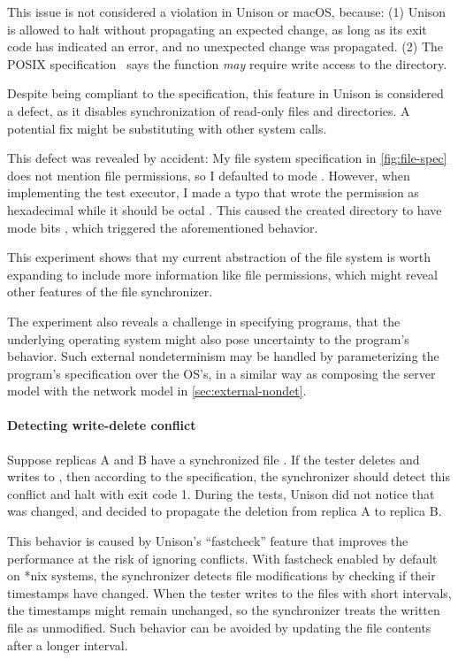 This issue is not considered a violation in Unison or macOS, because: (1) Unison
is allowed to halt without propagating an expected change, as long as its exit
code has indicated an error, and no unexpected change was propagated.  (2) The
POSIX specification~\cite{posix} says the  function {\it may}
require write access to the directory.

Despite being compliant to the specification, this feature in Unison is
considered a defect, as it disables synchronization of read-only files and
directories.  A potential fix might be substituting  with other
system calls.

This defect was revealed by accident: My file system specification in
\autoref{fig:file-spec} does not mention file permissions, so I defaulted to
mode .  However, when implementing the test executor, I made a typo
that wrote the permission as hexadecimal  while it should be octal
.  This caused the created directory to have mode bits ,
which triggered the aforementioned behavior.

This experiment shows that my current abstraction of the file system is worth
expanding to include more information like file permissions, which might reveal
other features of the file synchronizer.

The experiment also reveals a challenge in specifying programs, that the
underlying operating system might also pose uncertainty to the program's
behavior.  Such external nondeterminism may be handled by parameterizing the
program's specification over the OS's, in a similar way as composing the server
model with the network model in \autoref{sec:external-nondet}.

\paragraph{Detecting write-delete conflict}
Suppose replicas \ilj A and \ilj B have a synchronized file .  If
the tester deletes  and writes to , then according
to the specification, the synchronizer should detect this conflict and halt with
exit code 1.  During the tests, Unison did not notice that  was
changed, and decided to propagate the deletion from replica \ilj A to replica
\ilj B.

This behavior is caused by Unison's ``fastcheck'' feature that improves the
performance at the risk of ignoring conflicts.  With fastcheck enabled by
default on *nix systems, the synchronizer detects file modifications by checking
if their timestamps have changed.  When the tester writes to the files with
short intervals, the timestamps might remain unchanged, so the synchronizer
treats the written file as unmodified.  Such behavior can be avoided by updating
the file contents after a longer interval.

